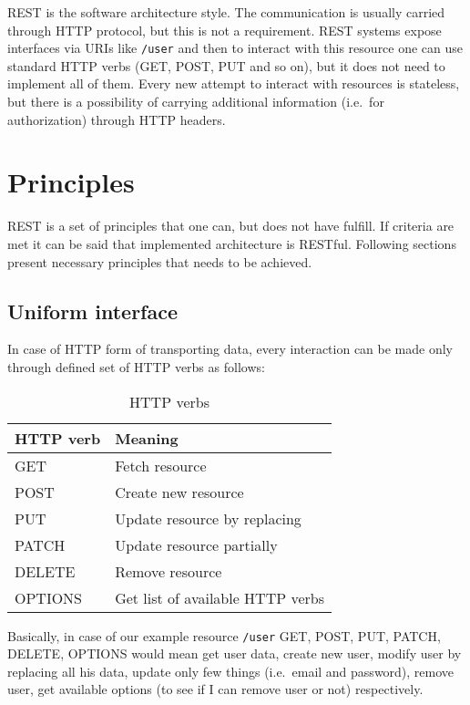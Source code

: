 REST is the software architecture style\cite{REST-wiki}. The communication is
usually carried through HTTP protocol, but this is not a requirement. REST
systems expose interfaces via URIs like\label{example-URI} \verb|/user| and
then to interact with this resource one can use standard HTTP verbs (GET, POST,
PUT and so on), but it does not need to implement all of them. Every new
attempt to interact with resources is stateless, but there is a possibility of
carrying additional information (i.e.\ for authorization) through HTTP headers.

\section{Principles}
REST is a set of principles that one can, but does not have fulfill. If
criteria are met it can be said that implemented architecture is RESTful.
Following sections present necessary principles that needs to be achieved.

\subsection{Uniform interface}
\label{uniform-interface}
In case of HTTP form of transporting data, every interaction can be made only
through defined set of HTTP verbs as follows:

\begin{table}[!htbp]
\centering
\begin{tabular}{ll} \toprule
 HTTP verb &  Meaning \\ \midrule
 GET & Fetch resource \\
 POST & Create new resource \\
 PUT & Update resource by replacing \\
 PATCH & Update resource partially \\
 DELETE & Remove resource \\
 OPTIONS & Get list of available HTTP verbs \\ \bottomrule
\end{tabular}
\caption{HTTP verbs}
\label{tab:http-verbs}
\end{table}

Basically, in case of our example resource \verb|/user| GET, POST, PUT, PATCH,
DELETE, OPTIONS would mean get user data, create new user, modify user by
replacing all his data, update only few things (i.e.\ email and password),
remove user, get available options (to see if I can remove user or not)
respectively.

